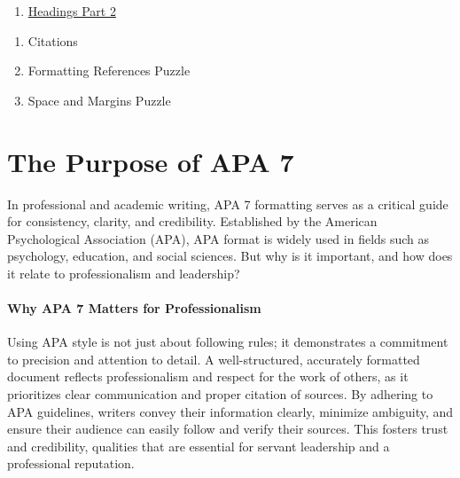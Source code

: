 \documentclass[
  letterpaper,
  DIV=11,
  numbers=noendperiod]{scrreprt}
\providecommand{\tightlist}{%
  \setlength{\itemsep}{0pt}\setlength{\parskip}{0pt}}\usepackage{longtable,booktabs,array}
\begin{document}
\begin{enumerate}
\def\labelenumi{\arabic{enumi}.}
\setcounter{enumi}{2}
\tightlist
\item
  \href{https://learn.twu.ca/mod/resource/view.php?id=1176290}{Headings
  Part 2}
\end{enumerate}

\begin{enumerate}
\def\labelenumi{\arabic{enumi}.}
\setcounter{enumi}{3}
\tightlist
\item
  Citations
\item
  Formatting References Puzzle
\item
  Space and Margins Puzzle
\end{enumerate}


\chapter*{}\label{section-9}

\markboth{}{}


\chapter*{The Purpose of APA 7}\label{the-purpose-of-apa-7}


In professional and academic writing, APA 7 formatting serves as a
critical guide for consistency, clarity, and credibility. Established by
the American Psychological Association (APA), APA format is widely used
in fields such as psychology, education, and social sciences. But why is
it important, and how does it relate to professionalism and leadership?

\subsubsection*{Why APA 7 Matters for
Professionalism}\label{why-apa-7-matters-for-professionalism}

Using APA style is not just about following rules; it demonstrates a
commitment to precision and attention to detail. A well-structured,
accurately formatted document reflects professionalism and respect for
the work of others, as it prioritizes clear communication and proper
citation of sources. By adhering to APA guidelines, writers convey their
information clearly, minimize ambiguity, and ensure their audience can
easily follow and verify their sources. This fosters trust and
credibility, qualities that are essential for servant leadership and a
professional reputation.
\end{document}
